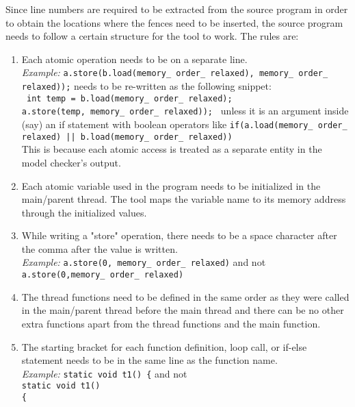 \par
Since line numbers are required to be extracted from the source program in order to obtain the locations where the fences need to be inserted, the source program needs to follow a certain structure for the tool to work. The rules are:
\begin{enumerate}
	\item Each atomic operation needs to be on a separate line.\\
	\textit{Example:} \texttt{a.store(b.load(memory\_ order\_ relaxed), memory\_ order\_ relaxed));} needs to be re-written as the following snippet:\\
	\texttt{%
	int temp = b.load(memory\_ order\_ relaxed);\\
	a.store(temp, memory\_ order\_ relaxed));%
	}
	unless it is an argument inside (say) an if statement with boolean operators like \texttt{if(a.load(memory\_ order\_ relaxed) || b.load(memory\_ order\_ relaxed)) }\\
	This is because each atomic access is treated as a separate entity in the model checker's output.
	
	\item Each atomic variable used in the program needs to be initialized in the main/parent thread. The tool maps the variable name to its memory address through the initialized values.
	
	\item While writing a "store" operation, there needs to be a space character after the comma after the value is written.\\
	\textit{Example:} \texttt{a.store(0, memory\_ order\_ relaxed)} and not \texttt{a.store(0,memory\_ order\_ relaxed)}
	
	\item The thread functions need to be defined in the same order as they were called in the main/parent thread before the main thread and there can be no other extra functions apart from the thread functions and the main function.
	
	\item The starting bracket for each function definition, loop call, or if-else statement needs to be in the same line as the function name.\\
	\textit{Example:} \texttt{static void t1() \{} and not\\ \texttt{static void t1()\\ \{}
	

\end{enumerate}
